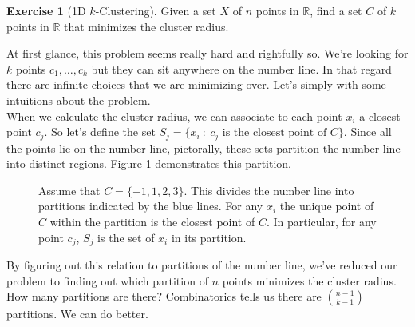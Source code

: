 \documentclass[10pt]{article}
\theoremstyle{plain}
\theoremstyle{definition}
\newtheorem{exer}[thm]{Exercise}
\newcommand{\RR}{\mathbb{R}}
\numberwithin{equation}{section}
\numberwithin{figure}{section}
\begin{document}
\begin{exer}[1D $k$-Clustering]
Given a set $X$ of $n$ points in $\RR$, find a set $C$ of $k$ points in $\RR$ that minimizes the cluster radius.
\end{exer}

\noindent At first glance, this problem seems really hard and rightfully so. We're looking for $k$ points $c_1, \ldots, c_k$ but they can sit anywhere on the number line. In that regard there are infinite choices that we are minimizing over. Let's simply with some intuitions about the problem. \\

\noindent When we calculate the cluster radius, we can associate to each point $x_i$ a closest point $c_j$. So let's define the set $S_j = \{x_i \ : \ c_j \text { is the closest point of } C \}$. Since all the points lie on the number line, pictorally, these sets partition the number line into distinct regions. Figure \ref{1d-partition} demonstrates this partition.
\begin{figure}[h]
\centering
{}

\caption{Assume that $C = \{-1, 1, 2, 3\}$. This divides the number line into partitions indicated by the blue lines. For any $x_i$ the unique point of $C$ within the partition is the closest point of $C$. In particular, for any point $c_j$, $S_j$ is the set of $x_i$ in its partition.}

\label{1d-partition}
\end{figure}

\noindent By figuring out this relation to partitions of the number line, we've reduced our problem to finding out which partition of $n$ points minimizes the cluster radius. How many partitions are there? Combinatorics tells us there are ${n - 1 \choose k - 1}$ partitions. We can do better. \\
\end{document}
